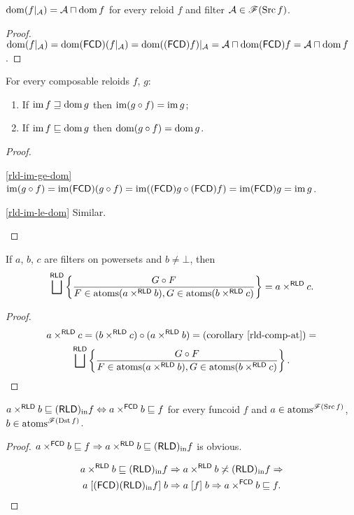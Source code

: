 \begin{prop}
$\operatorname{dom}(f|_{\mathcal{A}})=\mathcal{A}\sqcap\operatorname{dom} f$ for every reloid
$f$ and filter $\mathcal{A}\in\mathscr{F}(\operatorname{Src} f)$.\end{prop}
\begin{proof}
$\operatorname{dom}(f|_{\mathcal{A}})=\operatorname{dom}(\mathsf{FCD})(f|_{\mathcal{A}})=\operatorname{dom}((\mathsf{FCD}) f)|_{\mathcal{A}}=\mathcal{A}\sqcap\operatorname{dom}(\mathsf{FCD}) f=\mathcal{A}\sqcap\operatorname{dom} f$.\end{proof}
\begin{thm}
For every composable reloids $f$, $g$:
\begin{enumerate}
\item \label{rld-im-ge-dom}If $\operatorname{im} f\sqsupseteq\operatorname{dom} g$ then $\operatorname{im}(g\circ f)=\operatorname{im} g$;
\item \label{rld-im-le-dom}If $\operatorname{im} f\sqsubseteq\operatorname{dom} g$ then $\operatorname{dom}(g\circ f)=\operatorname{dom} g$.
\end{enumerate}
\end{thm}
\begin{proof}
~
\begin{widedisorder}
\item [{\ref{rld-im-ge-dom}}] $\operatorname{im}(g\circ f)=\operatorname{im}(\mathsf{FCD})(g\circ f)=\operatorname{im}((\mathsf{FCD}) g\circ(\mathsf{FCD}) f)=\operatorname{im}(\mathsf{FCD}) g=\operatorname{im} g$.
\item [{\ref{rld-im-le-dom}}] Similar.
\end{widedisorder}
\end{proof}
\begin{lem}
If $a$, $b$, $c$ are filters on powersets and $b\neq\bot$, then
\[
\bigsqcup^{\mathsf{RLD}}\left\{ \frac{G\circ F}{F\in\operatorname{atoms}(a\times^{\mathsf{RLD}}b),G\in\operatorname{atoms}(b\times^{\mathsf{RLD}}c)}\right\}=a\times^{\mathsf{RLD}}c.
\]
\end{lem}
\begin{proof}
~
\begin{multline*}
a\times^{\mathsf{RLD}}c=(b\times^{\mathsf{RLD}}c)\circ(a\times^{\mathsf{RLD}}b)=\text{(corollary \ref{rld-comp-at})}=\\
\bigsqcup^{\mathsf{RLD}}\setcond{G\circ F}{F\in\atoms(a\times^{\mathsf{RLD}}b),G\in\atoms(b\times^{\mathsf{RLD}}c)}.
\end{multline*}
\end{proof}
\begin{thm}
$a\times^{\mathsf{RLD}}b\sqsubseteq(\mathsf{RLD})_{\mathrm{in}} f\Leftrightarrow a\times^{\mathsf{FCD}}b\sqsubseteq f$
for every funcoid $f$ and $a\in\operatorname{atoms}^{\mathscr{F}(\operatorname{Src} f)}$, $b\in\operatorname{atoms}^{\mathscr{F}(\operatorname{Dst} f)}$.\end{thm}
\begin{proof}
$a\times^{\mathsf{FCD}}b\sqsubseteq f\Rightarrow a\times^{\mathsf{RLD}}b\sqsubseteq(\mathsf{RLD})_{\mathrm{in}} f$
is obvious.

\begin{multline*}
a\times^{\mathsf{RLD}}b\sqsubseteq(\mathsf{RLD})_{\mathrm{in}} f\Rightarrow a\times^{\mathsf{RLD}}b\not\asymp(\mathsf{RLD})_{\mathrm{in}} f\Rightarrow\\
a\mathrel{\left[(\mathsf{FCD})(\mathsf{RLD})_{\mathrm{in}} f\right]}b\Rightarrow a\mathrel{\left[f\right]}b\Rightarrow a\times^{\mathsf{FCD}}b\sqsubseteq f.
\end{multline*}
\end{proof}
